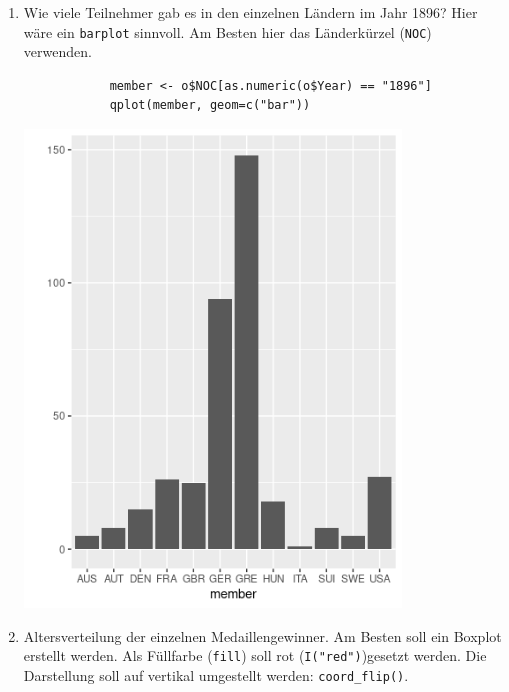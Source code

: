 \documentclass{article}
\begin{document}
	\begin{enumerate}
		\item Wie viele Teilnehmer gab es in den einzelnen Ländern im Jahr 1896? Hier wäre ein \texttt{barplot} sinnvoll. Am Besten hier das Länderkürzel (\texttt{NOC}) verwenden.
		
		\begin{lstlisting}
			member <- o$NOC[as.numeric(o$Year) == "1896"]
			qplot(member, geom=c("bar"))
		\end{lstlisting}
		\includegraphics[width=10cm]{2a.png}
		\newpage
		\item Altersverteilung der einzelnen Medaillengewinner. Am Besten soll ein Boxplot erstellt werden. Als Füllfarbe (\texttt{fill}) soll rot (\texttt{I("red")})gesetzt werden. Die Darstellung soll auf vertikal umgestellt werden: \texttt{coord\_flip()}.
		

\end{enumerate}
\end{document}
